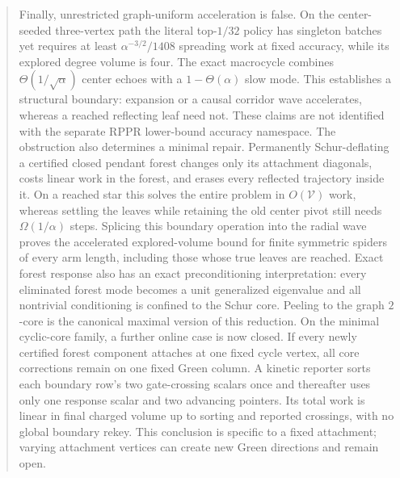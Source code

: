 \documentclass[11pt]{article}
\begin{document}
\begin{abstract}
Finally, unrestricted graph-uniform acceleration is false.  On the
center-seeded three-vertex path the literal top-$1/32$ policy has singleton
batches yet requires at least $\alpha^{-3/2}/1408$ spreading work at fixed
accuracy, while its explored degree volume is four.  The exact macrocycle
combines $\Theta(1/\sqrt\alpha)$ center echoes with a
$1-\Theta(\alpha)$ slow mode.  This establishes a structural boundary:
expansion or a causal corridor wave accelerates, whereas a reached reflecting
leaf need not. These claims are not identified with the separate RPPR
lower-bound accuracy namespace.  The obstruction also determines a minimal
repair.  Permanently Schur-deflating a certified closed pendant forest
changes only its attachment diagonals, costs linear work in the forest, and
erases every reflected trajectory inside it.  On a reached star this solves
the entire problem in $O(\mathcal V)$ work, whereas settling the leaves while
retaining the old center pivot still needs $\Omega(1/\alpha)$ steps.  Splicing
this boundary operation into the radial wave proves the accelerated
explored-volume bound for finite symmetric spiders of every arm length,
including those whose true leaves are reached.  Exact forest response also
has an exact preconditioning interpretation: every eliminated forest mode
becomes a unit generalized eigenvalue and all nontrivial conditioning is
confined to the Schur core.  Peeling to the graph $2$-core is the canonical
maximal version of this reduction.
On the minimal cyclic-core family, a further online case is now closed.
If every newly certified forest component attaches at one fixed cycle vertex,
all core corrections remain on one fixed Green column.  A kinetic reporter
sorts each boundary row's two gate-crossing scalars once and thereafter uses
only one response scalar and two advancing pointers.  Its total work is
linear in final charged volume up to sorting and reported crossings, with no
global boundary rekey.  This conclusion is specific to a fixed attachment;
varying attachment vertices can create new Green directions and remain open.
\end{abstract}










\end{document}
